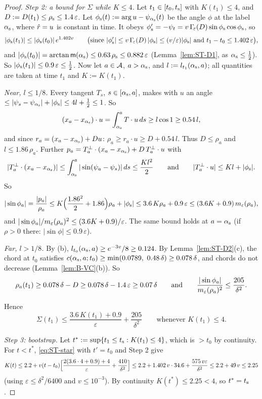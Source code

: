 \begin{proof}
\emph{Step 2: a bound for $\Sigma$ while $K\le4$.} Let $t_1\in[t_0,t_{\mathrm s}]$ with $K(t_1)\le4$, and $D:=D(t_1)\le\rho_{\mathrm s}\le1.4\,\varepsilon$.
Let $\phi_{\mathrm s}(t):=\arg u-\psi_{\alpha_{\mathrm s}}(t)$ be the angle $\phi$ at the label $\alpha_{\mathrm s}$, where $\hat r=u$ is constant in time. It obeys
$\phi_{\mathrm s}'=-\psi_t=v\,\Gamma_{\!\varepsilon}(D)\sin\phi_{\mathrm s}\cos\phi_{\mathrm s}$, so
\[
|\phi_{\mathrm s}(t_1)|\le|\phi_{\mathrm s}(t_0)|\,e^{1.402v}\qquad
\bigl(\text{since }|\phi_{\mathrm s}'|\le v\,\Gamma_{\!\varepsilon}(D)\,|\phi_{\mathrm s}|\le(v/\varepsilon)|\phi_{\mathrm s}|\text{ and }t_1-t_0\le1.402\,\varepsilon\bigr),
\]
and $|\phi_{\mathrm s}(t_0)|=\arctan\mathsf m(\alpha_{\mathrm s})\le0.63\,\rho_{\mathrm s}\le0.882\,\varepsilon$ (Lemma~\ref{lem:ST-D1}, as $\alpha_{\mathrm s}\le\frac12$). So
$|\phi_{\mathrm s}(t_1)|\le0.9\,\varepsilon\le\frac12$. Now let $a\in\mathcal A$, $a>\alpha_{\mathrm s}$, and $l:=l_{t_1}(\alpha_{\mathrm s},a)$; all quantities are taken at time
$t_1$ and $K:=K(t_1)$.

\emph{Near, $l\le1/8$.} Every tangent $T_s$, $s\in[\alpha_{\mathrm s},a]$, makes with $u$ an angle
$\le|\psi_s-\psi_{\alpha_{\mathrm s}}|+|\phi_{\mathrm s}|\le4l+\frac12\le1$. So
\[
(x_a-x_{\alpha_{\mathrm s}})\cdot u=\int_{\alpha_{\mathrm s}}^aT\cdot u\,ds\ge l\cos1\ge0.54\,l,
\]
and since $r_a=(x_a-x_{\alpha_{\mathrm s}})+Du$: $\rho_a\ge r_a\cdot u\ge D+0.54\,l$. Thus $D\le\rho_a$ and $l\le1.86\,\rho_a$. Further
$p_a=T_a^\perp\cdot(x_a-x_{\alpha_{\mathrm s}})+D\,T_a^\perp\cdot u$ with
\[
|T_a^\perp\cdot(x_a-x_{\alpha_{\mathrm s}})|\le\int_{\alpha_{\mathrm s}}^a|\sin(\psi_a-\psi_s)|\,ds\le\frac{Kl^2}2\qquad\text{and}\qquad
|T_a^\perp\cdot u|\le Kl+|\phi_{\mathrm s}| .
\]
So
\[
|\sin\phi_a|=\frac{|p_a|}{\rho_a}\le K\Bigl(\frac{1.86^2}2+1.86\Bigr)\rho_a+|\phi_{\mathrm s}|\le3.6\,K\rho_a+0.9\,\varepsilon
\le(3.6K+0.9)\,m_\varepsilon(\rho_a),
\]
and $|\sin\phi_a|/m_\varepsilon(\rho_a)^2\le(3.6K+0.9)/\varepsilon$. The same bound holds at $a=\alpha_{\mathrm s}$ (if $\rho>0$ there:
$|\sin\phi|\le0.9\,\varepsilon$).

\emph{Far, $l>1/8$.} By (b), $l_{t_0}(\alpha_{\mathrm s},a)\ge e^{-3v}/8\ge0.124$. By Lemma~\ref{lem:ST-D2}(c), the chord at $t_0$ satisfies
$c(\STas,a;t_0)\ge\min(0.0789,\ 0.48\,\delta)\ge0.078\,\delta$, and chords do not decrease (Lemma~\ref{lem:B-VC}(b)). So
\[
\rho_a(t_1)\ge0.078\,\delta-D\ge0.078\,\delta-1.4\,\varepsilon\ge0.07\,\delta\qquad\text{and}\qquad
\frac{|\sin\phi_a|}{m_\varepsilon(\rho_a)^2}\le\frac{205}{\delta^2}.
\]

Hence
\[
\Sigma(t_1)\le\frac{3.6\,K(t_1)+0.9}\varepsilon+\frac{205}{\delta^2}\qquad\text{whenever }K(t_1)\le4 .
\]

\emph{Step 3: bootstrap.} Let $t^*:=\sup\{t_1\le t_{\mathrm s}:K(t_1)\le4\}$, which is $>t_0$ by continuity. For $t<t^*$, \eqref{eq:ST-star}
with $t'=t_0$ and Step 2 give
\[
K(t)\le2.2+v(t-t_0)\Bigl[\frac{2(3.6\cdot4+0.9)+4}\varepsilon+\frac{410}{\delta^2}\Bigr]
\le2.2+1.402\,v\cdot34.6+\frac{575\,v\varepsilon}{\delta^2}\le2.2+49\,v\le2.25
\]
(using $\varepsilon\le\delta^2/6400$ and $v\le10^{-3}$). By continuity $K(t^*)\le2.25<4$, so $t^*=t_{\mathrm s}$.
\end{proof}

